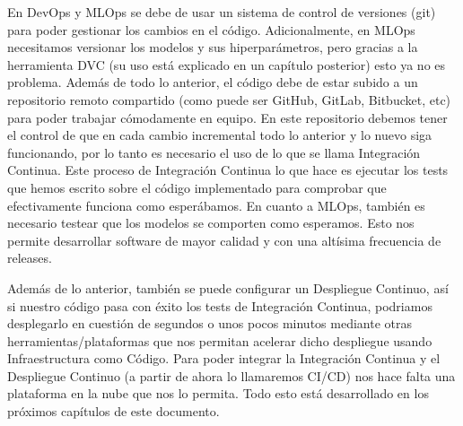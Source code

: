 En DevOps y MLOps se debe de usar un sistema de control de versiones (git) para poder gestionar los cambios en el código. Adicionalmente, en MLOps necesitamos versionar los modelos y sus hiperparámetros, pero gracias a la herramienta DVC (su uso está explicado en un capítulo posterior) esto ya no es problema. Además de todo lo anterior, el código debe de estar subido a un repositorio remoto compartido (como puede ser GitHub, GitLab, Bitbucket, etc) para poder trabajar cómodamente en equipo. En este repositorio debemos tener el control de que en cada cambio incremental todo lo anterior y lo nuevo siga funcionando, por lo tanto es necesario el uso de lo que se llama Integración Continua. Este proceso de Integración Continua lo que hace es ejecutar los tests que hemos escrito sobre el código implementado para comprobar que efectivamente funciona como esperábamos. En cuanto a MLOps, también es necesario testear que los modelos se comporten como esperamos. Esto nos permite desarrollar software de mayor calidad y con una altísima frecuencia de releases.\newline

Además de lo anterior, también se puede configurar un Despliegue Continuo, así si nuestro código pasa con éxito los tests de Integración Continua, podriamos desplegarlo en cuestión de segundos o unos pocos minutos mediante otras herramientas/plataformas que nos permitan acelerar dicho despliegue usando Infraestructura como Código. Para poder integrar la Integración Continua y el Despliegue Continuo (a partir de ahora lo llamaremos CI/CD) nos hace falta una plataforma en la nube que nos lo permita. Todo esto está desarrollado en los próximos capítulos de este documento.


